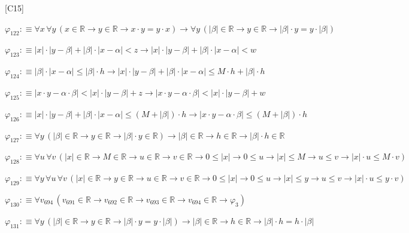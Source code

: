 \begin{fullproof}{[C15]}
\begin{abbrevlist}
\item $\varphi_{122} :\equiv \forall x\,\forall y\,(x \in \mathbb{R} \to y \in \mathbb{R} \to x \cdot y = y \cdot x) \to \forall y\,(\lvert \beta \rvert \in \mathbb{R} \to y \in \mathbb{R} \to \lvert \beta \rvert \cdot y = y \cdot \lvert \beta \rvert)$
\item $\varphi_{123} :\equiv \lvert x \rvert \cdot \lvert y - \beta \rvert + \lvert \beta \rvert \cdot \lvert x - \alpha \rvert < z \to \lvert x \rvert \cdot \lvert y - \beta \rvert + \lvert \beta \rvert \cdot \lvert x - \alpha \rvert < w$
\item $\varphi_{124} :\equiv \lvert \beta \rvert \cdot \lvert x - \alpha \rvert \leq \lvert \beta \rvert \cdot h \to \lvert x \rvert \cdot \lvert y - \beta \rvert + \lvert \beta \rvert \cdot \lvert x - \alpha \rvert \leq M \cdot h + \lvert \beta \rvert \cdot h$
\item $\varphi_{125} :\equiv \lvert x \cdot y - \alpha \cdot \beta \rvert < \lvert x \rvert \cdot \lvert y - \beta \rvert + z \to \lvert x \cdot y - \alpha \cdot \beta \rvert < \lvert x \rvert \cdot \lvert y - \beta \rvert + w$
\item $\varphi_{126} :\equiv \lvert x \rvert \cdot \lvert y - \beta \rvert + \lvert \beta \rvert \cdot \lvert x - \alpha \rvert \leq (M + \lvert \beta \rvert) \cdot h \to \lvert x \cdot y - \alpha \cdot \beta \rvert \leq (M + \lvert \beta \rvert) \cdot h$
\item $\varphi_{127} :\equiv \forall y\,(\lvert \beta \rvert \in \mathbb{R} \to y \in \mathbb{R} \to \lvert \beta \rvert \cdot y \in \mathbb{R}) \to \lvert \beta \rvert \in \mathbb{R} \to h \in \mathbb{R} \to \lvert \beta \rvert \cdot h \in \mathbb{R}$
\item $\varphi_{128} :\equiv \forall u\,\forall v\,(\lvert x \rvert \in \mathbb{R} \to M \in \mathbb{R} \to u \in \mathbb{R} \to v \in \mathbb{R} \to 0 \leq \lvert x \rvert \to 0 \leq u \to \lvert x \rvert \leq M \to u \leq v \to \lvert x \rvert \cdot u \leq M \cdot v)$
\item $\varphi_{129} :\equiv \forall y\,\forall u\,\forall v\,(\lvert x \rvert \in \mathbb{R} \to y \in \mathbb{R} \to u \in \mathbb{R} \to v \in \mathbb{R} \to 0 \leq \lvert x \rvert \to 0 \leq u \to \lvert x \rvert \leq y \to u \leq v \to \lvert x \rvert \cdot u \leq y \cdot v)$
\item $\varphi_{130} :\equiv \forall v_{694}\,(v_{691} \in \mathbb{R} \to v_{692} \in \mathbb{R} \to v_{693} \in \mathbb{R} \to v_{694} \in \mathbb{R} \to \varphi_{3})$
\item $\varphi_{131} :\equiv \forall y\,(\lvert \beta \rvert \in \mathbb{R} \to y \in \mathbb{R} \to \lvert \beta \rvert \cdot y = y \cdot \lvert \beta \rvert) \to \lvert \beta \rvert \in \mathbb{R} \to h \in \mathbb{R} \to \lvert \beta \rvert \cdot h = h \cdot \lvert \beta \rvert$

\end{abbrevlist}
\end{fullproof}
